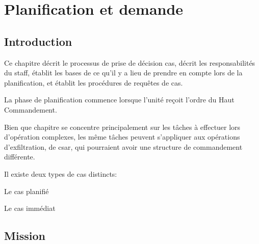 \chapter{Planification et demande}

\begin{center}
\end{center}

\section{Introduction}

Ce chapitre décrit le processus de prise de décision \gls{cas}, décrit les responsabilités du staff, établit les bases de ce qu'il y a lieu de prendre en compte lors de la planification, et établit les procédures de requêtes de \gls{cas}.

La phase de planification commence lorsque l'unité reçoit l'ordre du Haut Commandement.

Bien que chapitre se concentre principalement sur les tâches à effectuer lors d'opération complexes, les même tâches peuvent s'appliquer aux opérations d'exfiltration, de \gls{csar}, qui pourraient avoir une structure de commandement différente.


\e
    \item Il existe deux types de \gls{cas} distincts:
    \ee
        \item Le \gls{cas} planifié
        \item Le \gls{cas} immédiat
    \ed
\ed

\section{Mission}

